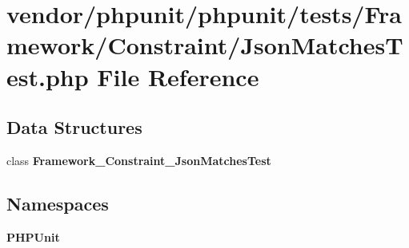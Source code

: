 \section{vendor/phpunit/phpunit/tests/\+Framework/\+Constraint/\+Json\+Matches\+Test.php File Reference}
\label{_json_matches_test_8php}
\subsection*{Data Structures}
\begin{DoxyCompactItemize}
\item 
class {\bf Framework\+\_\+\+Constraint\+\_\+\+Json\+Matches\+Test}
\end{DoxyCompactItemize}
\subsection*{Namespaces}
\begin{DoxyCompactItemize}
\item 
 {\bf P\+H\+P\+Unit}
\end{DoxyCompactItemize}
